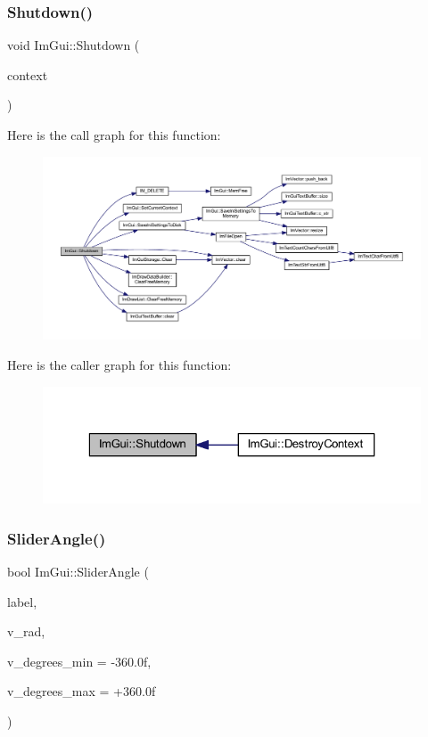 \subsubsection{\texorpdfstring{Shutdown()}{Shutdown()}}
{\footnotesize\ttfamily void Im\+Gui\+::\+Shutdown (\begin{DoxyParamCaption}\item[{\mbox{\hyperlink{struct_im_gui_context}{Im\+Gui\+Context}} $\ast$}]{context }\end{DoxyParamCaption})}

Here is the call graph for this function\+:
\nopagebreak
\begin{figure}[H]
\begin{center}
\leavevmode
\includegraphics[width=350pt]{namespace_im_gui_ae8e2043e5d630169423e2d14a913afa1_cgraph}
\end{center}
\end{figure}
Here is the caller graph for this function\+:
\nopagebreak
\begin{figure}[H]
\begin{center}
\leavevmode
\includegraphics[width=323pt]{namespace_im_gui_ae8e2043e5d630169423e2d14a913afa1_icgraph}
\end{center}
\end{figure}
\mbox{\label{namespace_im_gui_ad20170a9fff4ded0076476dad8ec6645}} 
\subsubsection{\texorpdfstring{Slider\+Angle()}{SliderAngle()}}
{\footnotesize\ttfamily bool Im\+Gui\+::\+Slider\+Angle (\begin{DoxyParamCaption}\item[{const char $\ast$}]{label,  }\item[{float $\ast$}]{v\+\_\+rad,  }\item[{float}]{v\+\_\+degrees\+\_\+min = {\ttfamily -\/360.0f},  }\item[{float}]{v\+\_\+degrees\+\_\+max = {\ttfamily +360.0f} }\end{DoxyParamCaption})}

